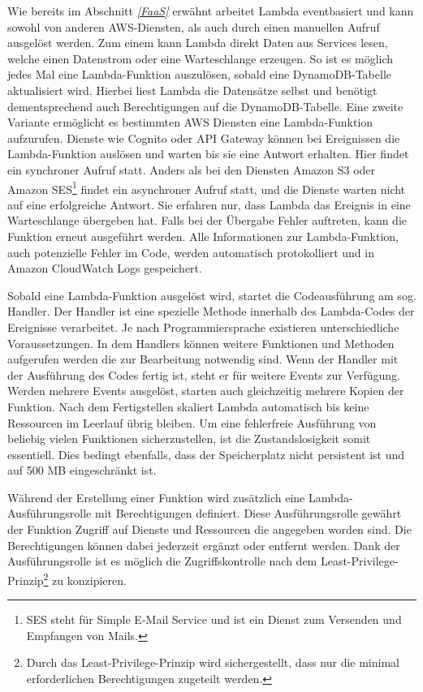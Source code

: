 {Wie bereits im Abschnitt \textit{\ref{FaaS} } erwähnt arbeitet Lambda eventbasiert und kann sowohl von anderen AWS-Diensten, als auch durch einen manuellen Aufruf ausgelöst werden.
Zum einem kann Lambda direkt Daten aus Services lesen, welche einen Datenstrom oder eine Warteschlange erzeugen.
So ist es möglich jedes Mal eine Lambda-Funktion auszulösen, sobald eine DynamoDB-Tabelle aktualisiert wird.
Hierbei liest Lambda die Datensätze selbst und benötigt dementsprechend auch Berechtigungen auf die DynamoDB-Tabelle.\cite{LambdaDynamo}
Eine zweite Variante ermöglicht es bestimmten AWS Diensten eine Lambda-Funktion aufzurufen.
Dienste wie Cognito oder API Gateway können bei Ereignissen die Lambda-Funktion auslösen und warten bis sie eine Antwort erhalten.
Hier findet ein synchroner Aufruf statt.
Anders als bei den Diensten Amazon S3 oder Amazon SES\footnote{SES steht für Simple E-Mail Service und ist ein Dienst zum Versenden und Empfangen von Mails.} findet ein asynchroner Aufruf statt, und die Dienste warten nicht auf eine erfolgreiche Antwort.
Sie erfahren nur, dass Lambda das Ereignis in eine Warteschlange übergeben hat.
Falls bei der Übergabe Fehler auftreten, kann die Funktion erneut ausgeführt werden.
Alle Informationen zur Lambda-Funktion, auch potenzielle Fehler im Code, werden automatisch protokolliert und in Amazon CloudWatch Logs gespeichert.
\cite{LambdaDienste}

Sobald eine Lambda-Funktion ausgelöst wird, startet die Codeausführung am sog. Handler.
Der Handler ist eine spezielle Methode innerhalb des Lambda-Codes der Ereignisse verarbeitet.
Je nach Programmiersprache existieren unterschiedliche Voraussetzungen.
In dem Handlers können weitere Funktionen und Methoden aufgerufen werden die zur Bearbeitung notwendig sind.
Wenn der Handler mit der Ausführung des Codes fertig ist, steht er für weitere Events zur Verfügung.
Werden mehrere Events ausgelöst, starten auch gleichzeitig mehrere Kopien der Funktion.
Nach dem Fertigstellen skaliert Lambda automatisch bis keine Ressourcen im Leerlauf übrig bleiben.
Um eine fehlerfreie Ausführung von beliebig vielen Funktionen sicherzustellen, ist die Zustandslosigkeit somit essentiell.
Dies bedingt ebenfalls, dass der Speicherplatz nicht persistent ist und auf 500 MB eingeschränkt ist.\cite[Seite 5f]{AWSWhitepaper}

Während der Erstellung einer Funktion wird zusätzlich eine Lambda-Ausführungsrolle mit Berechtigungen definiert.
Diese Ausführungsrolle gewährt der Funktion Zugriff auf Dienste und Ressourcen die angegeben worden sind.
Die Berechtigungen können dabei jederzeit ergänzt oder entfernt werden.
Dank der Ausführungsrolle ist es möglich die Zugriffskontrolle nach dem Least-Privilege-Prinzip\footnote{Durch das Least-Privilege-Prinzip wird sichergestellt, dass nur die minimal erforderlichen Berechtigungen zugeteilt werden. } zu konzipieren.

}
